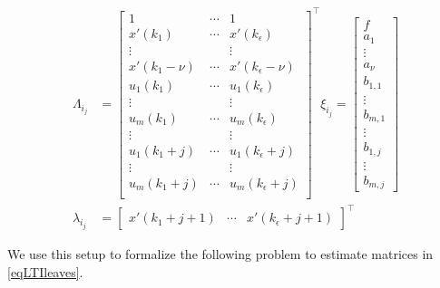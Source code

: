 \documentclass[letterpaper, 10 pt, conference]{ifacconf}  %
\begin{document}
\begin{align}
\Lambda_{i_j} &= \left[\begin{array}{ccc}
						1               & \cdots & 1                    \\ 
						x'(k_1)         & \cdots & x'(k_\epsilon)       \\  
						\vdots          &        &     \vdots           \\
						x'(k_1 - \nu)   & \cdots & x'(k_\epsilon - \nu) \\
						u_1(k_1)        & \cdots & u_1(k_\epsilon)      \\
						\vdots          &        & \vdots               \\
						u_m(k_1)        & \cdots & u_m(k_\epsilon)      \\ 
						\vdots          &        & \vdots               \\ 
						u_1(k_1 + j)    & \cdots & u_1(k_\epsilon + j)  \\
						\vdots          &        & \vdots               \\
						u_m(k_1  +j)    & \cdots & u_m(k_\epsilon + j)  \\   
				 \end{array}\right]^\top
\xi_{i_j}      = \left[\begin{array}{c}
				 		f \\ a_1 \\ \vdots \\ a_\nu \\ b_{1,1} \\ \vdots  \\ b_{m,1} \\ \vdots \\ b_{1,j} \\ \vdots \\ b_{m,j}
				 \end{array}\right]\\
\lambda_{i_j} &= \left[\begin{array}{ccc}
						x'(k_1 + j + 1) & \cdots & x'(k_\epsilon + j + 1)
				 \end{array}\right]^\top
\end{align}
\normalsize

We use this setup to formalize the following problem to estimate matrices in \eqref{eqLTIleaves}.
\end{document}
